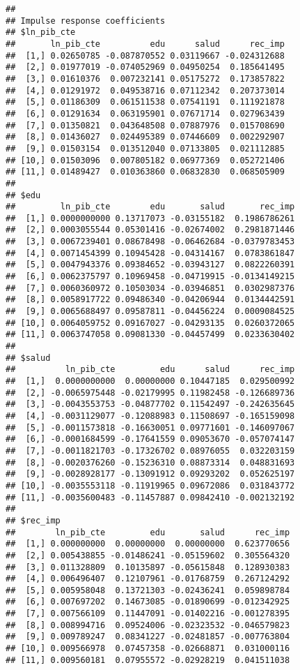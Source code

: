 \documentclass[]{book}
\theoremstyle{definition}
\theoremstyle{definition}
\theoremstyle{definition}
\theoremstyle{remark}
\begin{document}
\begin{verbatim}
## 
## Impulse response coefficients
## $ln_pib_cte
##       ln_pib_cte          edu      salud      rec_imp
##  [1,] 0.02650785 -0.087870552 0.03119667 -0.024312688
##  [2,] 0.01977019 -0.074052969 0.04950254  0.185641495
##  [3,] 0.01610376  0.007232141 0.05175272  0.173857822
##  [4,] 0.01291972  0.049538716 0.07112342  0.207373014
##  [5,] 0.01186309  0.061511538 0.07541191  0.111921878
##  [6,] 0.01291634  0.063195901 0.07671714  0.027963439
##  [7,] 0.01350821  0.043648508 0.07887976  0.015708690
##  [8,] 0.01436027  0.024495389 0.07446609  0.002292907
##  [9,] 0.01503154  0.013512040 0.07133805  0.021112885
## [10,] 0.01503096  0.007805182 0.06977369  0.052721406
## [11,] 0.01489427  0.010363860 0.06832830  0.068505909
## 
## $edu
##         ln_pib_cte        edu       salud       rec_imp
##  [1,] 0.0000000000 0.13717073 -0.03155182  0.1986786261
##  [2,] 0.0003055544 0.05301416 -0.02674002  0.2981871446
##  [3,] 0.0067239401 0.08678498 -0.06462684 -0.0379783453
##  [4,] 0.0071454399 0.10945428 -0.04314167  0.0783861847
##  [5,] 0.0047943376 0.09384652 -0.03943127  0.0822260391
##  [6,] 0.0062375797 0.10969458 -0.04719915 -0.0134149215
##  [7,] 0.0060360972 0.10503034 -0.03946851  0.0302987376
##  [8,] 0.0058917722 0.09486340 -0.04206944  0.0134442591
##  [9,] 0.0065688497 0.09587811 -0.04456224  0.0009084525
## [10,] 0.0064059752 0.09167027 -0.04293135  0.0260372065
## [11,] 0.0063747058 0.09081330 -0.04457499  0.0233630402
## 
## $salud
##          ln_pib_cte         edu      salud      rec_imp
##  [1,]  0.0000000000  0.00000000 0.10447185  0.029500992
##  [2,] -0.0065975448 -0.02179995 0.11982458 -0.126689736
##  [3,] -0.0043553753 -0.04877702 0.11542497 -0.242635645
##  [4,] -0.0031129077 -0.12088983 0.11508697 -0.165159098
##  [5,] -0.0011573818 -0.16630051 0.09771601 -0.146097067
##  [6,] -0.0001684599 -0.17641559 0.09053670 -0.057074147
##  [7,] -0.0011821703 -0.17326702 0.08976055  0.032203159
##  [8,] -0.0020376260 -0.15236310 0.08873314  0.048831693
##  [9,] -0.0028928177 -0.13091912 0.09293202  0.052625197
## [10,] -0.0035553118 -0.11919965 0.09672086  0.031843772
## [11,] -0.0035600483 -0.11457887 0.09842410 -0.002132192
## 
## $rec_imp
##        ln_pib_cte         edu       salud      rec_imp
##  [1,] 0.000000000  0.00000000  0.00000000  0.623770656
##  [2,] 0.005438855 -0.01486241 -0.05159602  0.305564320
##  [3,] 0.011328809  0.10135897 -0.05615848  0.128930383
##  [4,] 0.006496407  0.12107961 -0.01768759  0.267124292
##  [5,] 0.005958048  0.13721303 -0.02436241  0.059898784
##  [6,] 0.007697202  0.14673085 -0.01890699 -0.012342925
##  [7,] 0.007566109  0.11447091 -0.01402216 -0.001278395
##  [8,] 0.008994716  0.09524006 -0.02323532 -0.046579823
##  [9,] 0.009789247  0.08341227 -0.02481857 -0.007763804
## [10,] 0.009566978  0.07457358 -0.02668871  0.031000116
## [11,] 0.009560181  0.07955572 -0.02928219  0.041511038
\end{verbatim}
\end{document}
